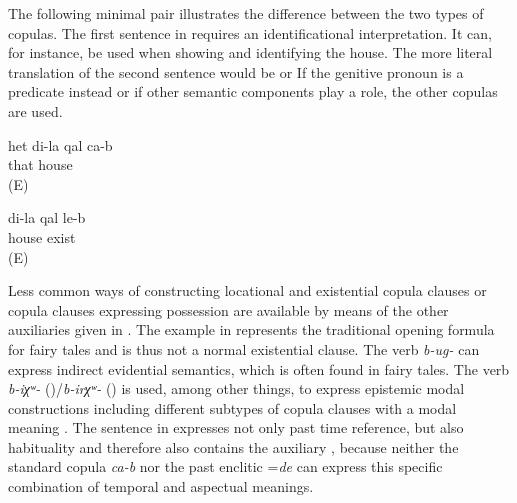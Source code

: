 The following minimal pair illustrates the difference between the two types of copulas. The first sentence in  requires an identificational interpretation. It can, for instance, be used when showing and identifying the house. The more literal translation of the second sentence  would be  or  If the genitive pronoun is a predicate instead  or if other semantic components play a role, the other copulas are used. 
%
\begin{exe}
	\ex	\label{ex:That is my house}
	\gll	het	di-la	qal	ca-b\\
		that 	house	\\
	\glt	{} (E)

	\ex	\label{ex:I have a house}
	\gll	di-la	qal	le-b\\
			house	exist\\
	\glt	{} (E)
\end{exe}


Less common ways of constructing locational and existential copula clauses or copula clauses expressing possession are available by means of the other auxiliaries given in . The example in  represents the traditional opening formula for fairy tales and is thus not a normal existential clause. The verb \textit{b-ug-} can express indirect evidential semantics, which is often found in fairy tales. The verb \textit{b-iχʷ-} ()\slash\textit{b-irχʷ-} ()  is used, among other things, to express epistemic modal constructions including different subtypes of copula clauses with a modal meaning . The sentence in  expresses not only past time reference, but also habituality and therefore also contains the auxiliary , because neither the standard copula \textit{ca-b} nor the past enclitic =\textit{de} can express this specific combination of temporal and aspectual meanings.

